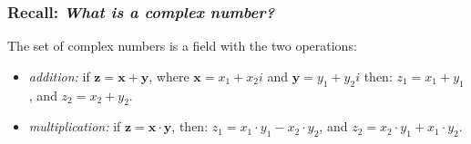 \begin{frame}[fragile]\frametitle{Recall: \emph{What is a complex number?}}

\hfill
{}

%

  The set of complex numbers is a field with the two operations:
  \begin{itemize}
  \item
    \emph{addition:} if $\mathbf{z} = \mathbf{x} + \mathbf{y}$, where $\mathbf{x} = x_1 + x_2i$ and $\mathbf{y} = y_1 + y_2i$
    then: $z_1 = x_1 + y_1$, and $z_2 = x_2 + y_2$.

  \item
    \emph{multiplication:} if $\mathbf{z} = \mathbf{x} \cdot
    \mathbf{y}$, then:
 $z_1 = x_1\cdot y_1 - x_2 \cdot y_2$, and $z_2 = x_2\cdot y_1 + x_1\cdot y_2$.
  \end{itemize}
\end{frame}

